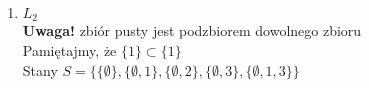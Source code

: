 \documentclass[a4paper,12pt]{article}
\theoremstyle{definition}%
\theoremstyle{definition}
\theoremstyle{problem}
\begin{document}
\begin{enumerate}[label=\alph*)]
\begin{enumerate}
\begin{align*}
\begin{matrix}
\frac{1}{6} \pi _1+\frac{1}{6} \pi _5 &=\frac{1}{3} \pi _4\\
\frac{1}{6} \pi _2+\frac{1}{6} \pi _4 &= \frac{1}{3}\pi _5
\end{matrix}\right. \Leftrightarrow \\
&\Leftrightarrow \left\{\begin{matrix}
\pi _1 &= \pi _2\\
\pi _1 &= \pi _3\\
\pi _1 &= \pi _4 \\
\pi _1 &= \pi _5 
\end{matrix}\right.\\
&\pi _1+\pi _2+\pi _3+\pi _4+\pi _5=1\Leftrightarrow 5\pi _1 = 1 \Leftrightarrow \pi _1 = \frac{1}{5}\\
&\bar{\pi}=\left[\frac{1}{5},\frac{1}{5},\frac{1}{5},\frac{1}{5},\frac{1}{5}\right]
\end{align*}

\item $L_2$\\
\textbf{Uwaga!} zbiór pusty jest podzbiorem dowolnego zbioru\\
Pamiętajmy, że $\{1\} \subset \{1\}$\\
Stany $S=\{\{\emptyset\},\{\emptyset,1\},\{\emptyset,2\},\{\emptyset,3\},\{\emptyset,1,3\} \}$


\end{enumerate}
\end{enumerate}
\end{document}
